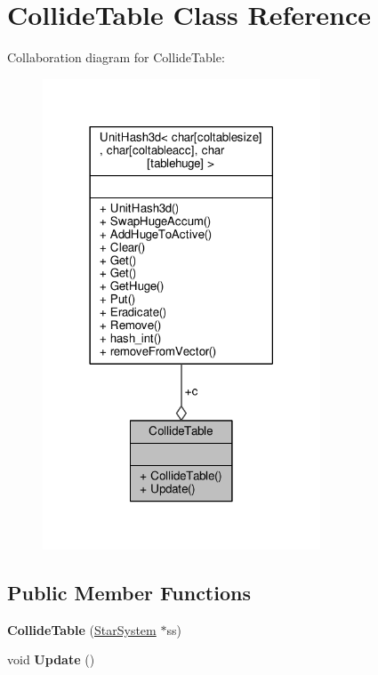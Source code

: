 \hypertarget{classCollideTable}{}\section{Collide\+Table Class Reference}
\label{classCollideTable}


Collaboration diagram for Collide\+Table\+:
\nopagebreak
\begin{figure}[H]
\begin{center}
\leavevmode
\includegraphics[width=234pt]{d9/db8/classCollideTable__coll__graph}
\end{center}
\end{figure}
\subsection*{Public Member Functions}
\begin{DoxyCompactItemize}
\item 
{\bfseries Collide\+Table} (\hyperlink{classStarSystem}{Star\+System} $\ast$ss)\hypertarget{classCollideTable_aabf875d6697f736ead59a303adf434d3}{}\label{classCollideTable_aabf875d6697f736ead59a303adf434d3}

\item 
void {\bfseries Update} ()\hypertarget{classCollideTable_a850dd5298c09bf0e9247fcf62f042ec0}{}\label{classCollideTable_a850dd5298c09bf0e9247fcf62f042ec0}

\end{DoxyCompactItemize}
